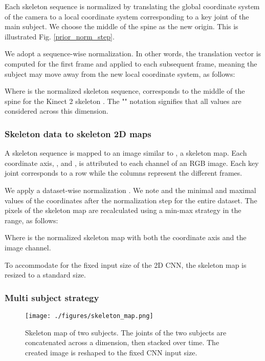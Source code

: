 \documentclass[letterpaper, 10 pt, conference]{ieeeconf}
\begin{document}
Each skeleton sequence is normalized by translating the global coordinate system of the camera to a local coordinate system corresponding to a key joint of the main subject. We choose the middle of the spine as the new origin. This is illustrated Fig. \ref{prior_norm_step}.

We adopt a sequence-wise normalization. In other words, the translation vector is computed for the first frame and applied to each subsequent frame, meaning the subject may move away from the new local coordinate system, as follows:



Where  is the normalized skeleton sequence,  corresponds to the middle of the spine for the Kinect 2 skeleton \cite{zhang2012microsoft}. The "" notation signifies that all values are considered across this dimension.

\subsubsection{Skeleton data to skeleton 2D maps}

A skeleton sequence is mapped to an image similar to \cite{du2015skeleton}, a skeleton map. Each coordinate axis, ,  and , is attributed to each channel of an RGB image. Each key joint corresponds to a row while the columns represent the different frames. 

We apply a dataset-wise normalization \cite{du2015skeleton}. We note  and  the minimal and maximal values of the coordinates after the normalization step for the entire dataset. The pixels of the skeleton map are recalculated using a min-max strategy in the  range, as follows: 



Where  is the normalized skeleton map with  both the coordinate axis and the image channel. 

To accommodate for the fixed input size of the 2D CNN, the skeleton map is resized to a standard size.

\subsubsection{Multi subject strategy}

\begin{figure}[t]
  \centering
  \texttt{[image: ./figures/skeleton\_map.png]}
  \caption{Skeleton map of two subjects. The joints of the two subjects are concatenated across a dimension, then stacked over time. The created image is reshaped to the fixed CNN input size.}
  \label{skeleton_map}
\end{figure}
\end{document}
